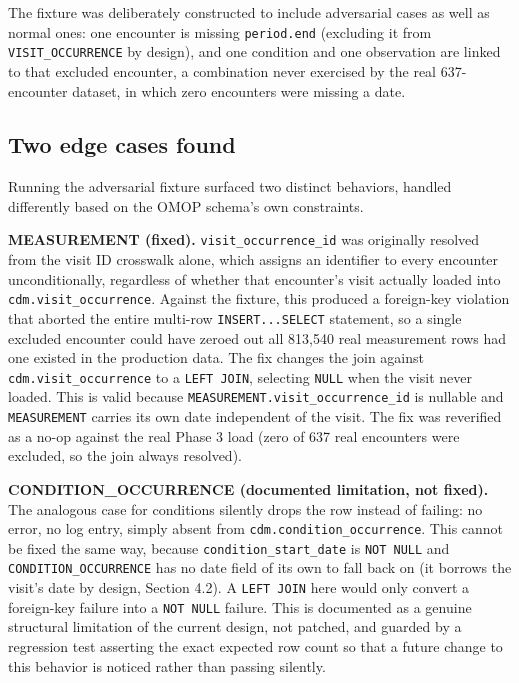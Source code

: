 \documentclass[11pt]{article}
\begin{document}
The fixture was deliberately constructed to include adversarial cases
as well as normal ones: one encounter is missing
\texttt{period.end} (excluding it from \texttt{VISIT\_OCCURRENCE} by
design), and one condition and one observation are linked to that
excluded encounter, a combination never exercised by the real
637-encounter dataset, in which zero encounters were missing a date.

\subsection{Two edge cases found}

Running the adversarial fixture surfaced two distinct behaviors, handled
differently based on the OMOP schema's own constraints.

\textbf{MEASUREMENT (fixed).} \texttt{visit\_occurrence\_id} was originally
resolved from the visit ID crosswalk alone, which assigns an identifier to
every encounter unconditionally, regardless of whether that encounter's
visit actually loaded into \texttt{cdm.visit\_occurrence}. Against the
fixture, this produced a foreign-key violation that aborted the entire
multi-row \texttt{INSERT...SELECT} statement, so a single excluded
encounter could have zeroed out all 813{,}540 real measurement rows had one
existed in the production data. The fix changes the join against
\texttt{cdm.visit\_occurrence} to a \texttt{LEFT JOIN}, selecting
\texttt{NULL} when the visit never loaded. This is valid because
\texttt{MEASUREMENT.visit\_occurrence\_id} is nullable and
\texttt{MEASUREMENT} carries its own date independent of the visit. The fix
was reverified as a no-op against the real Phase 3 load (zero of 637 real
encounters were excluded, so the join always resolved).

\textbf{CONDITION\_OCCURRENCE (documented limitation, not fixed).} The
analogous case for conditions silently drops the row instead of failing:
no error, no log entry, simply absent from \texttt{cdm.condition\_occurrence}.
This cannot be fixed the same way, because \texttt{condition\_start\_date}
is \texttt{NOT NULL} and \texttt{CONDITION\_OCCURRENCE} has no date field
of its own to fall back on (it borrows the visit's date by design,
Section 4.2). A \texttt{LEFT JOIN} here would only convert a foreign-key
failure into a \texttt{NOT NULL} failure. This is documented as a genuine
structural limitation of the current design, not patched, and guarded by a
regression test asserting the exact expected row count so that a future
change to this behavior is noticed rather than passing silently.
\end{document}
